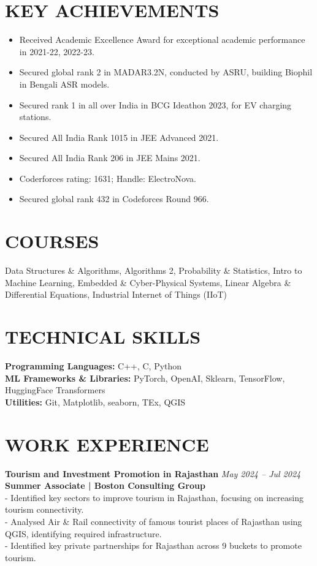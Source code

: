 \documentclass[a4paper,10pt]{article}
\begin{document}
\section*{KEY ACHIEVEMENTS}
\begin{itemize}[left=0pt]
    \item Received Academic Excellence Award for exceptional academic performance in 2021-22, 2022-23.
    \item Secured global rank 2 in MADAR3.2N, conducted by ASRU, building Biophil in Bengali ASR models.
    \item Secured rank 1 in all over India in BCG Ideathon 2023, for EV charging stations.
    \item Secured All India Rank 1015 in JEE Advanced 2021.
    \item Secured All India Rank 206 in JEE Mains 2021.
    \item Coderforces rating: 1631; Handle: ElectroNova.
    \item Secured global rank 432 in Codeforces Round 966.
\end{itemize}

\section*{COURSES}
\noindent
Data Structures \& Algorithms, Algorithms 2, Probability \& Statistics, Intro to Machine Learning, Embedded \& Cyber-Physical Systems, Linear Algebra \& Differential Equations, Industrial Internet of Things (IIoT)

\section*{TECHNICAL SKILLS}
\noindent
\textbf{Programming Languages:} C++, C, Python \\
\textbf{ML Frameworks \& Libraries:} PyTorch, OpenAI, Sklearn, TensorFlow, HuggingFace Transformers \\
\textbf{Utilities:} Git, Matplotlib, seaborn, TEx, QGIS

\section*{WORK EXPERIENCE}
\noindent
\textbf{Tourism and Investment Promotion in Rajasthan} \hfill \textit{May 2024 -- Jul 2024} \\
\textbf{Summer Associate | Boston Consulting Group} \\
- Identified key sectors to improve tourism in Rajasthan, focusing on increasing tourism connectivity.\\
- Analysed Air \& Rail connectivity of famous tourist places of Rajasthan using QGIS, identifying required infrastructure. \\
- Identified key private partnerships for Rajasthan across 9 buckets to promote tourism. \\
\vspace{2mm}
\end{document}
